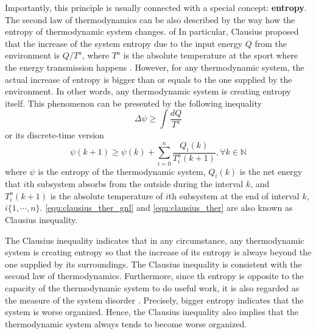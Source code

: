 \documentclass[preprint,authoryear,12pt]{elsarticle}
\begin{document}
Importantly, this principle is usually connected with a special
concept: \textbf{entropy}. The second law of thermodynamics can be
also described by the way how the entropy of thermodynamic system
changes.
of
In particular, Clausius proposed that the increase of the system
entropy due to the input energy $Q$ from the environment is $Q/T^a$,
where $T^a$ is the absolute temperature at the sport where the energy
transmission happens \citep{clausius_mechanical_1867}. However, for
any thermodynamic system, the actual increase of entropy is bigger
than or equals to the one supplied by the environment. In other
words, any thermodynamic system is creating entropy itself. This
phenomenon can be presented by the following inequality
\begin{equation}\label{equ:clausius_ther_gnl}
\Delta \psi \ge \int\frac{dQ}{T^a}
\end{equation}
or its discrete-time version \citep{haddad_thermodynamic_2005}
\begin{equation}\label{equ:clausius_ther}
\psi(k+1) \ge \psi(k)+\sum_{i=0}^{n}\frac{Q_i(k)}{T^a_i(k+1)},
\forall k\in\mathbb{N}
\end{equation}
where $\psi$ is the entropy of the thermodynamic system, $Q_i(k)$ is
the net energy that $i$th subsystem absorbs from the outside during
the interval $k$, and $T^a_i(k+1)$ is the absolute temperature of
$i$th subsystem at the end of interval $k$, $i\{1,\cdots,n\}$.
\eqref{equ:clausius_ther_gnl} and \eqref{equ:clausius_ther} are also
known as Clausius inequality.


The Clausius inequality indicates that in any circumstance, any
thermodynamic system is creating entropy so that the increase of its
entropy is always beyond the one supplied by its surroundings. The
Clausius inequality is consistent  with the second law of
thermodynamics. Furthermore, since th entropy is opposite to the
capacity of the thermodynamic system to do useful work, it is also
regarded as the measure of the system disorder
\citep{balmakov_entropy_2001}. Precisely, bigger entropy indicates
that the system is worse organized. Hence, the Clausius inequality
also implies that the thermodynamic system always tends to become
worse organized.
\end{document}

